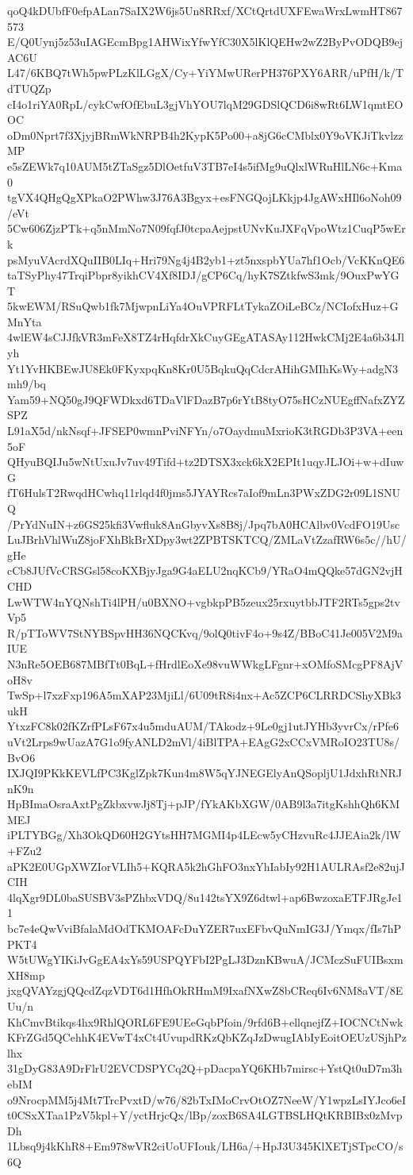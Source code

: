 qoQ4kDUbfF0efpALan7SaIX2W6js5Un8RRxf/XCtQrtdUXFEwaWrxLwmHT867573
E/Q0Uynj5z53uIAGEcmBpg1AHWixYfwYfC30X5lKlQEHw2wZ2ByPvODQB9ejAC6U
L47/6KBQ7tWh5pwPLzKlLGgX/Cy+YiYMwURerPH376PXY6ARR/uPfH/k/TdTUQZp
cI4o1riYA0RpL/cykCwfOfEbuL3gjVhYOU7lqM29GDSlQCD6i8wRt6LW1qmtEOOC
oDm0Nprt7f3XjyjBRmWkNRPB4h2KypK5Po00+a8jG6cCMblx0Y9oVKJiTkvlzzMP
e5sZEWk7q10AUM5tZTaSgz5DlOetfuV3TB7eI4s5ifMg9uQlxlWRuHlLN6c+Kma0
tgVX4QHgQgXPkaO2PWhw3J76A3Bgyx+esFNGQojLKkjp4JgAWxHIl6oNoh09/eVt
5Cw606ZjzPTk+q5nMmNo7N09fqfJ0tcpaAejpstUNvKuJXFqVpoWtz1CuqP5wErk
psMyuVAcrdXQuIIB0LIq+Hri79Ng4j4B2yb1+zt5nxspbYUa7hf1Ocb/VcKKnQE6
taTSyPhy47TrqiPbpr8yikhCV4Xf8IDJ/gCP6Cq/hyK7SZtkfwS3mk/9OuxPwYGT
5kwEWM/RSuQwb1fk7MjwpnLiYa4OuVPRFLtTykaZOiLeBCz/NCIofxHuz+GMnYta
4wlEW4sCJJfkVR3mFeX8TZ4rHqfdrXkCuyGEgATASAy112HwkCMj2E4a6b34Jlyh
Yt1YvHKBEwJU8Ek0FKyxpqKn8Kr0U5BqkuQqCdcrAHihGMIhKsWy+adgN3mh9/bq
Yam59+NQ50gJ9QFWDkxd6TDaVlFDazB7p6rYtB8tyO75sHCzNUEgffNafxZYZSPZ
L91aX5d/nkNsqf+JFSEP0wmnPviNFYn/o7OaydmuMxrioK3tRGDb3P3VA+een5oF
QHyuBQIJu5wNtUxuJv7uv49Tifd+tz2DTSX3xck6kX2EPIt1uqyJLJOi+w+dIuwG
fT6HulsT2RwqdHCwhq11rlqd4f0jms5JYAYRcs7aIof9mLn3PWxZDG2r09L1SNUQ
/PrYdNuIN+z6GS25kfi3Vwfluk8AnGbyvXs8B8j/Jpq7bA0HCAlbv0VcdFO19Usc
LuJBrhVhlWuZ8joFXhBkBrXDpy3wt2ZPBTSKTCQ/ZMLaVtZzafRW6s5c//hU/gHe
cCb8JUfVcCRSGsl58coKXBjyJga9G4aELU2nqKCb9/YRaO4mQQke57dGN2vjHCHD
LwWTW4nYQNshTi4lPH/u0BXNO+vgbkpPB5zeux25rxuytbbJTF2RTs5gps2tvVp5
R/pTToWV7StNYBSpvHH36NQCKvq/9olQ0tivF4o+9s4Z/BBoC41Je005V2M9aIUE
N3nRe5OEB687MBfTt0BqL+fHrdlEoXe98vuWWkgLFgnr+xOMfoSMcgPF8AjVoH8v
TwSp+l7xzFxp196A5mXAP23MjiLl/6U09tR8i4nx+Ac5ZCP6CLRRDCShyXBk3ukH
YtxzFC8k02fKZrfPLsF67x4u5mduAUM/TAkodz+9Le0gj1utJYHb3yvrCx/rPfe6
uVt2Lrps9wUazA7G1o9fyANLD2mVl/4iBlTPA+EAgG2xCCxVMRoIO23TU8s/BvO6
IXJQI9PKkKEVLfPC3KglZpk7Kun4m8W5qYJNEGElyAnQSopljU1JdxhRtNRJnK9n
HpBImaOsraAxtPgZkbxvwJj8Tj+pJP/fYkAKbXGW/0AB9l3a7itgKshhQh6KMMEJ
iPLTYBGg/Xh3OkQD60H2GYtsHH7MGMI4p4LEcw5yCHzvuRc4JJEAia2k/lW+FZu2
aPK2E0UGpXWZIorVLIh5+KQRA5k2hGhFO3nxYhIabIy92H1AULRAsf2e82ujJCIH
4lqXgr9DL0baSUSBV3sPZhbxVDQ/8u142tsYX9Z6dtwl+ap6BwzoxaETFJRgJe11
bc7e4eQwVviBfalaMdOdTKMOAFcDuYZER7uxEFbvQuNmIG3J/Ymqx/fIs7hPPKT4
W5tUWgYIKiJvGgEA4xYs59USPQYFbI2PgLJ3DznKBwuA/JCMczSuFUIBsxmXH8mp
jxgQVAYzgjQQcdZqzVDT6d1HfhOkRHmM9IxafNXwZ8bCReq6Iv6NM8aVT/8EUu/n
KhCmvBtikqs4hx9RhlQORL6FE9UEeGqbPfoin/9rfd6B+ellqnejfZ+IOCNCtNwk
KFrZGd5QCehhK4EVwT4xCt4UvupdRKzQbKZqJzDwugIAbIyEoitOEUzUSjhPzlhx
31gDyG83A9DrFlrU2EVCDSPYCq2Q+pDacpaYQ6KHb7mirsc+YstQt0uD7m3hebIM
o9NrocpMM5j4Mt7TrcPvxtD/w76/82bTxIMoCrvOtOZ7NeeW/Y1wpzLsIYJco6eI
t0CSxXTaa1PzV5kpl+Y/yctHrjcQx/lBp/zoxB6SA4LGTBSLHQtKRBIBx0zMvpDh
1Lbsq9j4kKhR8+Em978wVR2ciUoUFIouk/LH6a/+HpJ3U345KlXETjSTpcCO/s6Q
